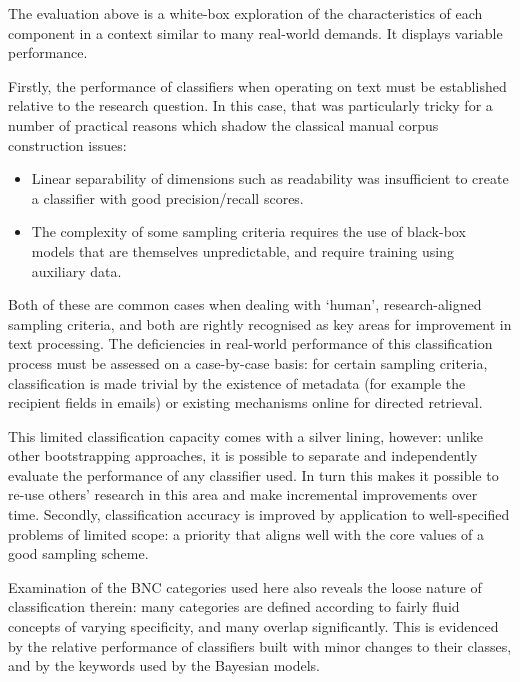 



The evaluation above is a white-box exploration of the characteristics of each component in a context similar to many real-world demands.  It displays variable performance.

Firstly, the performance of classifiers when operating on text must be established relative to the research question.  In this case, that was particularly tricky for a number of practical reasons which shadow the classical manual corpus construction issues:

\begin{itemize}
    \item Linear separability of dimensions such as readability was insufficient to create a classifier with good precision/recall scores.
    \item The complexity of some sampling criteria requires the use of black-box models that are themselves unpredictable, and require training using auxiliary data.
\end{itemize}

Both of these are common cases when dealing with `human', research-aligned sampling criteria, and both are rightly recognised as key areas for improvement in text processing.  The deficiencies in real-world performance of this classification process must be assessed on a case-by-case basis: for certain sampling criteria, classification is made trivial by the existence of metadata (for example the recipient fields in emails) or existing mechanisms online for directed retrieval.  

This limited classification capacity comes with a silver lining, however: unlike other bootstrapping approaches, it is possible to separate and independently evaluate the performance of any classifier used.  In turn this makes it possible to re-use others' research in this area and make incremental improvements over time.  Secondly, classification accuracy is improved by application to well-specified problems of limited scope: a priority that aligns well with the core values of a good sampling scheme.


Examination of the BNC categories used here also reveals the loose nature of classification therein: many categories are defined according to fairly fluid concepts of varying specificity, and many overlap significantly.  This is evidenced by the relative performance of classifiers built with minor changes to their classes, and by the keywords used by the Bayesian models.  



